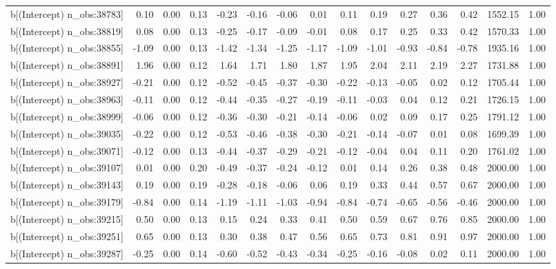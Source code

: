 \begin{table}[ht]
\begin{tabular}{rrrrrrrrrrrrrrr}
  b[(Intercept) n\_obs:38783] & 0.10 & 0.00 & 0.13 & -0.23 & -0.16 & -0.06 & 0.01 & 0.11 & 0.19 & 0.27 & 0.36 & 0.42 & 1552.15 & 1.00 \\ 
  b[(Intercept) n\_obs:38819] & 0.08 & 0.00 & 0.13 & -0.25 & -0.17 & -0.09 & -0.01 & 0.08 & 0.17 & 0.25 & 0.33 & 0.42 & 1570.33 & 1.00 \\ 
  b[(Intercept) n\_obs:38855] & -1.09 & 0.00 & 0.13 & -1.42 & -1.34 & -1.25 & -1.17 & -1.09 & -1.01 & -0.93 & -0.84 & -0.78 & 1935.16 & 1.00 \\ 
  b[(Intercept) n\_obs:38891] & 1.96 & 0.00 & 0.12 & 1.64 & 1.71 & 1.80 & 1.87 & 1.95 & 2.04 & 2.11 & 2.19 & 2.27 & 1731.88 & 1.00 \\ 
  b[(Intercept) n\_obs:38927] & -0.21 & 0.00 & 0.12 & -0.52 & -0.45 & -0.37 & -0.30 & -0.22 & -0.13 & -0.05 & 0.02 & 0.12 & 1705.44 & 1.00 \\ 
  b[(Intercept) n\_obs:38963] & -0.11 & 0.00 & 0.12 & -0.44 & -0.35 & -0.27 & -0.19 & -0.11 & -0.03 & 0.04 & 0.12 & 0.21 & 1726.15 & 1.00 \\ 
  b[(Intercept) n\_obs:38999] & -0.06 & 0.00 & 0.12 & -0.36 & -0.30 & -0.21 & -0.14 & -0.06 & 0.02 & 0.09 & 0.17 & 0.25 & 1791.12 & 1.00 \\ 
  b[(Intercept) n\_obs:39035] & -0.22 & 0.00 & 0.12 & -0.53 & -0.46 & -0.38 & -0.30 & -0.21 & -0.14 & -0.07 & 0.01 & 0.08 & 1699.39 & 1.00 \\ 
  b[(Intercept) n\_obs:39071] & -0.12 & 0.00 & 0.13 & -0.44 & -0.37 & -0.29 & -0.21 & -0.12 & -0.04 & 0.04 & 0.11 & 0.20 & 1761.02 & 1.00 \\ 
  b[(Intercept) n\_obs:39107] & 0.01 & 0.00 & 0.20 & -0.49 & -0.37 & -0.24 & -0.12 & 0.01 & 0.14 & 0.26 & 0.38 & 0.48 & 2000.00 & 1.00 \\ 
  b[(Intercept) n\_obs:39143] & 0.19 & 0.00 & 0.19 & -0.28 & -0.18 & -0.06 & 0.06 & 0.19 & 0.33 & 0.44 & 0.57 & 0.67 & 2000.00 & 1.00 \\ 
  b[(Intercept) n\_obs:39179] & -0.84 & 0.00 & 0.14 & -1.19 & -1.11 & -1.03 & -0.94 & -0.84 & -0.74 & -0.65 & -0.56 & -0.46 & 2000.00 & 1.00 \\ 
  b[(Intercept) n\_obs:39215] & 0.50 & 0.00 & 0.13 & 0.15 & 0.24 & 0.33 & 0.41 & 0.50 & 0.59 & 0.67 & 0.76 & 0.85 & 2000.00 & 1.00 \\ 
  b[(Intercept) n\_obs:39251] & 0.65 & 0.00 & 0.13 & 0.30 & 0.38 & 0.47 & 0.56 & 0.65 & 0.73 & 0.81 & 0.91 & 0.97 & 2000.00 & 1.00 \\ 
  b[(Intercept) n\_obs:39287] & -0.25 & 0.00 & 0.14 & -0.60 & -0.52 & -0.43 & -0.34 & -0.25 & -0.16 & -0.08 & 0.02 & 0.11 & 2000.00 & 1.00 \\ 

\end{tabular}
\end{table}
